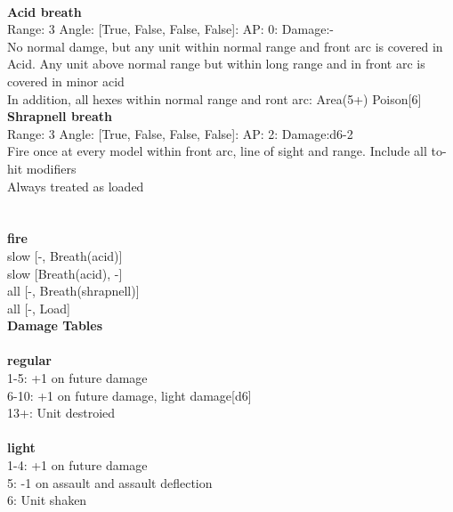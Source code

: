 \ \\
{\bf Acid breath } \\



Range: 3  Angle: [True, False, False, False]: AP: 0: Damage:- \\
No normal damge, but any unit within normal range and front arc is covered in Acid. Any unit above normal range but within long range and in front arc is covered in minor acid\\ 
In addition, all hexes within normal range and ront arc: Area(5+) Poison[6]\\ 




{\bf Shrapnell breath } \\



Range: 3  Angle: [True, False, False, False]: AP: 2: Damage:d6-2 \\
Fire once at every model within front arc, line of sight and range. Include all to-hit modifiers\\ 
Always treated as loaded\\ 




 
\ \\



\ \\ {\bf fire } \\
slow [-, Breath(acid)] \\
slow [Breath(acid), -] \\
all [-, Breath(shrapnell)] \\
all [-, Load] \\


{\bf Damage Tables} \\
\ \\ {\bf regular } \\
1-5: +1 on future damage \\
6-10: +1 on future damage, light damage[d6] \\
13+: Unit destroied \\
\ \\ {\bf light } \\
1-4: +1 on future damage \\
5: -1 on assault and assault deflection \\
6: Unit shaken \\










